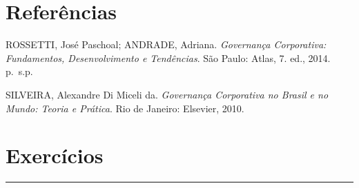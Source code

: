 \documentclass[
]{book}
\begin{document}
\section{Referências}\label{referuxeancias-2}

ROSSETTI, José Paschoal; ANDRADE, Adriana. \emph{Governança Corporativa: Fundamentos, Desenvolvimento e Tendências}. São Paulo: Atlas, 7. ed., 2014. p.~s.p.

SILVEIRA, Alexandre Di Miceli da. \emph{Governança Corporativa no Brasil e no Mundo: Teoria e Prática}. Rio de Janeiro: Elsevier, 2010.

\section{Exercícios}\label{exercuxedcios-2}

\begin{center}\rule{0.5\linewidth}{0.5pt}\end{center}
\end{document}
